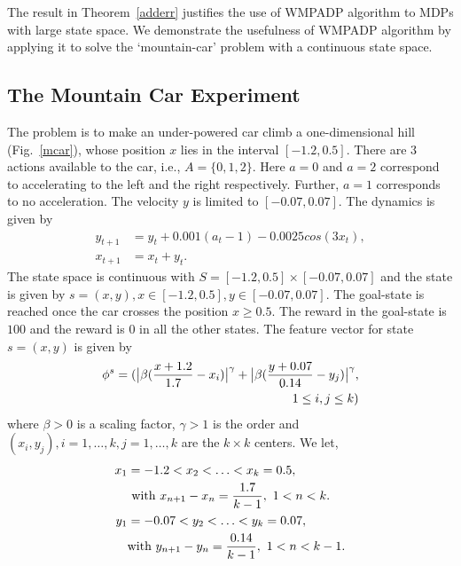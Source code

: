 The result in Theorem~\ref{adderr} justifies the use of WMPADP algorithm to MDPs with large state space. We demonstrate the usefulness of WMPADP algorithm by applying it to solve the `mountain-car' problem with a continuous state space.
\subsection{The Mountain Car Experiment}
The problem is to make an under-powered car climb a one-dimensional hill (Fig.~\ref{mcar}), whose position $x$ lies in the interval $[-1.2,0.5]$. There are $3$ actions available to the car, i.e., $A=\{0,1,2\}$. Here $a=0$ and $a=2$ correspond to accelerating to the left and the right respectively. Further, $a=1$ corresponds to no acceleration. The velocity $y$ is limited to $[-0.07,0.07]$. The dynamics is given by
\begin{align}
y_{t+1}&=y_t+0.001 (a_t-1)-0.0025 cos(3x_t),\\
x_{t+1}&=x_t+y_t.
\end{align}
The state space is continuous with $S=[-1.2,0.5]\times[-0.07,0.07]$ and the state is given by $s=(x,y), x\in [-1.2,0.5], y \in [-0.07,0.07]$. The goal-state is reached once the car crosses the position $x\geq 0.5$. The reward in the goal-state is $100$ and the reward is $0$ in all the other states. The feature vector for state $s=(x,y)$ is given by
\begin{align}\label{basisdef}
\phi^s=(\big|\beta(\frac{x+1.2}{1.7}-x_i)\big|^\gamma+\big|\beta(\frac{y+0.07}{0.14}-y_j)\big|^\gamma,\nonumber\\ 1\leq i,j\leq k)
\end{align}
where $\beta>0$ is a scaling factor, $\gamma>1$ is the order and $(x_i,y_j), i=1,\ldots,k, j=1,\ldots,k$ are the $k \times k$ centers. We let,
\begin{align}\label{centers}
x_1&=-1.2<x_2<\ldots<x_k=0.5,\\\mbox{ }&\text{ with}\mbox{ } x_{n+1}-x_n=\frac{1.7}{k-1},\mbox{ } 1<n<k.\nonumber\\ 
y_1&=-0.07<y_2<\ldots<y_k=0.07,\nonumber\\ \mbox{ } &\text{with} \mbox{ } y_{n+1}-y_n=\frac{0.14}{k-1},\mbox{ } 1<n<k-1.\nonumber
\end{align}
\begin{comment}
\begin{figure}
\begin{tikzpicture}
\begin{axis}
\addplot[only marks, black] plot file{cen.txt};
\end{axis}
\end{tikzpicture}
\label{gridp}
\caption{Various centers for the basis functions.}
\end{figure}
\end{comment}
